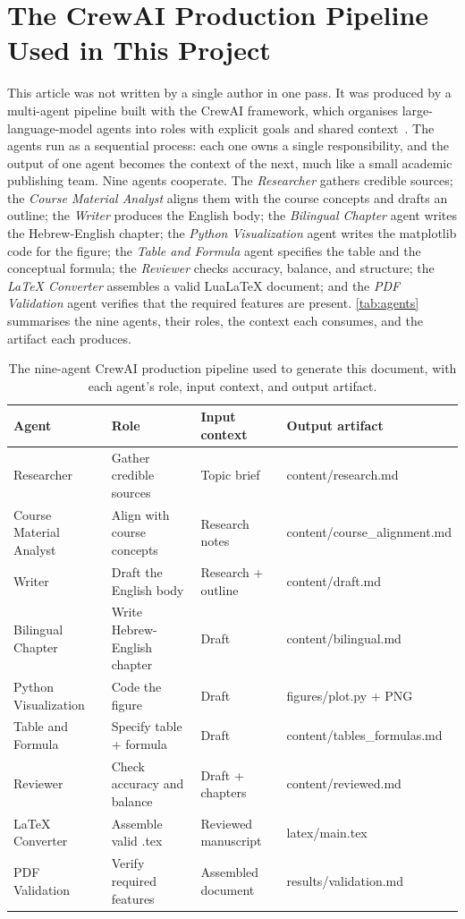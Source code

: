 \documentclass[11pt,a4paper]{report}
\begin{document}
\chapter{The CrewAI Production Pipeline Used in This Project}
This article was not written by a single author in one pass. It was produced
by a multi-agent pipeline built with the CrewAI framework, which organises
large-language-model agents into roles with explicit goals and shared
context~\cite{crewai2024}. The agents run as a sequential process: each one
owns a single responsibility, and the output of one agent becomes the context
of the next, much like a small academic publishing team. Nine agents
cooperate. The \emph{Researcher} gathers credible sources; the \emph{Course
Material Analyst} aligns them with the course concepts and drafts an outline;
the \emph{Writer} produces the English body; the \emph{Bilingual Chapter}
agent writes the Hebrew-English chapter; the \emph{Python Visualization} agent
writes the matplotlib code for the figure; the \emph{Table and Formula} agent
specifies the table and the conceptual formula; the \emph{Reviewer} checks
accuracy, balance, and structure; the \emph{LaTeX Converter} assembles a valid
LuaLaTeX document; and the \emph{PDF Validation} agent verifies that the
required features are present. \autoref{tab:agents} summarises the nine agents,
their roles, the context each consumes, and the artifact each produces.
\begin{table}[ht]
  \centering
  \small
  \caption{The nine-agent CrewAI production pipeline used to generate this
    document, with each agent's role, input context, and output artifact.}
  \label{tab:agents}
  \begin{tabular}{@{}p{2.7cm}p{3.6cm}p{3.3cm}p{3.1cm}@{}}
    \toprule
    \textbf{Agent} & \textbf{Role} & \textbf{Input context} &
      \textbf{Output artifact} \\
    \midrule
    Researcher & Gather credible sources & Topic brief &
      content/research.md \\
    Course Material Analyst & Align with course concepts & Research notes &
      content/course\_alignment.md \\
    Writer & Draft the English body & Research + outline &
      content/draft.md \\
    Bilingual Chapter & Write Hebrew-English chapter & Draft &
      content/bilingual.md \\
    Python Visualization & Code the figure & Draft &
      figures/plot.py + PNG \\
    Table and Formula & Specify table + formula & Draft &
      content/tables\_formulas.md \\
    Reviewer & Check accuracy and balance & Draft + chapters &
      content/reviewed.md \\
    LaTeX Converter & Assemble valid .tex & Reviewed manuscript &
      latex/main.tex \\
    PDF Validation & Verify required features & Assembled document &
      results/validation.md \\
    \bottomrule
  \end{tabular}
\end{table}
\end{document}
